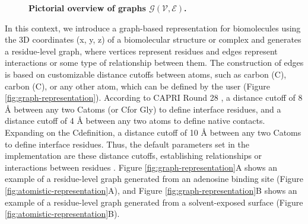 \documentclass[Ingles]{phdthesis}
\begin{document}
\begin{figure}[h]
\begin{subfigure}{0.32\textwidth}
  \end{subfigure}
  \caption[Pictorial overview of graphs $\mathcal{G(V,E)}$]{\textbf{Pictorial overview of graphs $\mathcal{G(V,E)}$.}}
  \label{fig:graph-examples}
\end{figure}

In this context, we introduce a graph-based representation for biomolecules using the 3D coordinates (x, y, z) of a biomolecular structure or complex and generates a residue-level graph, where vertices represent residues and edges represent interactions or some type of relationship between them. The construction of edges is based on customizable distance cutoffs between atoms, such as \textalpha\space carbon (C\textalpha), \textbeta\space carbon (C\textbeta), or any other atom, which can be defined by the user (Figure \ref{fig:graph-representation}). According to CAPRI Round 28 \cite{capri,round28}, a distance cutoff of 8 Å between any two C\textbeta\space atoms (or C\textalpha\space for Gly) to define interface residues, and a distance cutoff of 4 Å between any two atoms to define native contacts. Expanding on the C\textbeta\space definition, a distance cutoff of 10 Å between any two C\textalpha\space atoms to define interface residues. Thus, the default parameters set in the implementation are these distance cutoffs, establishing relationships or interactions between residues \cite{vishveshwara2002,mason2007}. Figure \ref{fig:graph-representation}A shows an example of a residue-level graph generated from an adenosine binding site (Figure \ref{fig:atomistic-representation}A), and Figure \ref{fig:graph-representation}B shows an example of a residue-level graph generated from a solvent-exposed surface (Figure \ref{fig:atomistic-representation}B).
\end{document}
